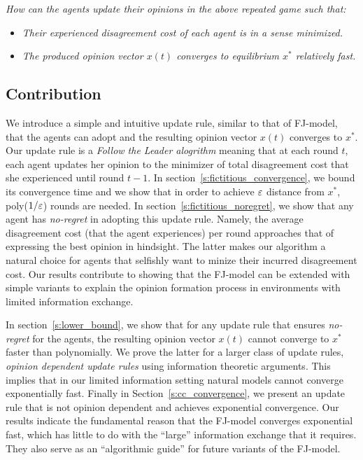\emph{How can the agents update their opinions in the above
repeated game such that:}
\begin{itemize}
\item \emph{Their experienced disagreement cost of each agent is in a sense minimized.}
\item \emph{The produced opinion vector $x(t)$ converges to equilibrium $x^*$
 relatively fast.}
\end{itemize}

\subsection{Contribution}
We introduce a simple and intuitive update rule,
similar to that of FJ-model, that the agents can adopt
and the resulting opinion vector $x(t)$ converges to $x^*$.
Our update rule is a \emph{Follow the Leader alogrithm}
meaning that at each round $t$, each agent updates her opinion
to the minimizer of total disagreement cost that
she experienced until round $t-1$. In section~\ref{s:fictitious_convergence},
we bound its convergence time and we show that in order
to achieve $\varepsilon$ distance from $x^*$, poly($1/\varepsilon$) rounds 
are needed. In section~\ref{s:fictitious_noregret},
we show that any agent has \emph{no-regret} in adopting
this update rule. Namely, the average disagreement cost (that
the agent experiences) per round approaches that
of expressing the best opinion in hindsight. The latter
makes our algorithm a natural choice for agents that 
selfishly want to minize their incurred disagreement cost.
Our results contribute to showing that the FJ-model 
can be extended with simple variants to explain
the opinion formation process in environments with limited
information exchange. 

In section~\ref{s:lower_bound}, we show 
that for any update rule that ensures \emph{no-regret}
for the agents, the resulting opinion vector $x(t)$
cannot converge to $x^*$ faster than polynomially. We
prove the latter for a larger class of update rules,
\emph{opinion dependent update rules} using information
theoretic arguments. This implies that in our limited 
information setting natural models cannot converge exponentially
fast. Finally in Section~\ref{s:cc_convergence}, we present 
an update rule that is not opinion dependent and achieves exponential
convergence. Our results indicate the fundamental reason that
the FJ-model converges exponential fast, which has little 
to do with the \enquote{large} information exchange that it requires.
They also serve as an \enquote{algorithmic guide} for future 
variants of the FJ-model. 



